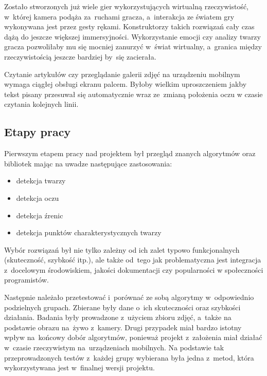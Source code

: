 \par

Zostało stworzonych już wiele gier wykorzystujących wirtualną rzeczywistość, w~której kamera podąża za~ruchami gracza, a~interakcja ze światem gry wykonywana jest przez gesty rękami. Konstruktorzy takich rozwiązań cały czas dążą do jeszcze większej immersyjności. Wykorzystanie emocji czy analizy twarzy gracza pozwoliłaby mu się mocniej zanurzyć w~świat wirtualny, a~granica między rzeczywistością jeszcze bardziej by~się zacierała. 

\par

Czytanie artykułów czy przeglądanie galerii zdjęć na urządzeniu mobilnym wymaga ciągłej obsługi ekranu palcem. Byłoby wielkim uproszczeniem jakby tekst pisany przesuwał się automatycznie wraz ze~zmianą położenia oczu w czasie czytania kolejnych linii. 


\subsection{Etapy pracy}

Pierwszym etapem pracy nad projektem był przegląd znanych algorytmów oraz bibliotek mając na uwadze następujące zastosowania:

\begin{itemize}
    \item detekcja twarzy
    \item detekcja oczu
    \item detekcja źrenic
    \item detekcja punktów charakterystycznych twarzy
\end{itemize}

Wybór rozwiązań był nie tylko zależny od ich zalet typowo funkcjonalnych (skuteczność, szybkość itp.), ale także od~tego jak problematyczna jest integracja z~docelowym środowiskiem, jakości dokumentacji czy popularności w społeczności programistów.

\par

Następnie należało przetestować i~porównać ze sobą algorytmy w~odpowiednio podzielnych grupach. Zbierane były dane o~ich skuteczności oraz szybkości działania. Badania były prowadzone z~użyciem zbioru zdjęć, a~także na podstawie obrazu na~żywo z~kamery. Drugi przypadek miał bardzo istotny wpływ na~końcowy dobór algorytmów, ponieważ projekt z~założenia miał działać w~czasie rzeczywistym na~urządzeniach mobilnych. Na podstawie tak przeprowadzonych testów z~każdej grupy wybierana była jedna z~metod, która wykorzystywana jest w~finalnej wersji projektu.

